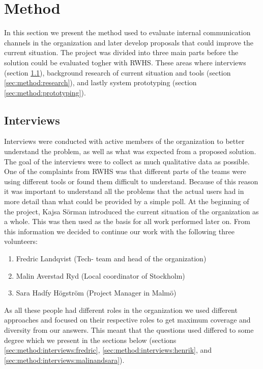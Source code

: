 \section{Method}
\label{sec:method}
In this section we present the method used to evaluate internal communication channels in the organization and later develop proposals that could improve the current situation. The project was divided into three main parts before the solution could be evaluated togher with RWHS. These areas where interviews (section \ref{sec:method:interviews}), background research of current situation and tools (section \ref{sec:method:research}), and lastly system prototyping (section \ref{sec:method:prototyping}).

\subsection{Interviews}
\label{sec:method:interviews}
Interviews were conducted with active members of the organization to better understand the problem, as well as what was expected from a proposed solution. The goal of the interviews were to collect as much qualitative data as possible. One of the complaints from RWHS was that different parts of the teams were using different tools or found them difficult to understand. Because of this reason it was important to understand all the problems that the actual users had in more detail than what could be provided by a simple poll. At the beginning of the project, Kajsa Sörman introduced the current situation of the organization as a whole. This was then used as the basis for all work performed later on. From this information we decided to continue our work with the following three volunteers:
\begin{enumerate}
\item Fredric Landqvist (Tech- team and head of the organization)
\item Malin Averstad Ryd (Local coordinator of Stockholm)
\item Sara Hadfy Högström (Project Manager in Malmö)
\end{enumerate}
As all these people had different roles in the organization we used different approaches and focused on their respective roles to get maximum coverage and diversity from our answers. This meant that the questions used differed to some degree which we present in the sections below (sections \ref{sec:method:interviews:fredric}, \ref{sec:method:interviews:henrik}, and \ref{sec:method:interviews:malinandsara}).


